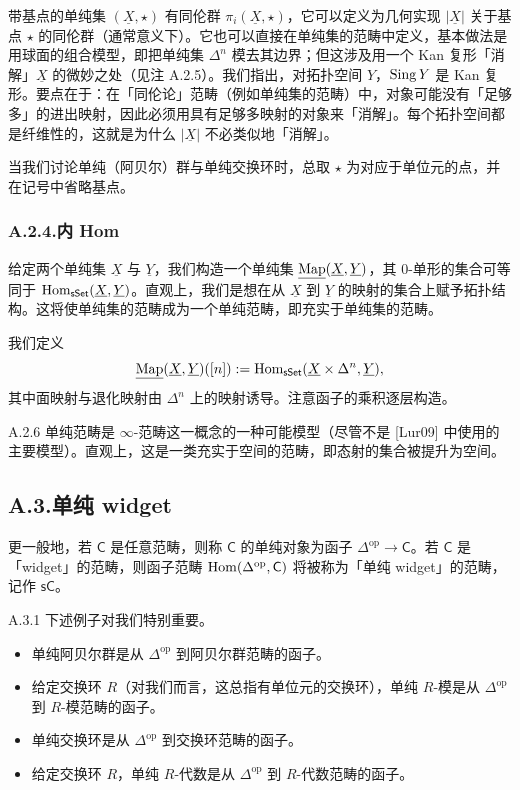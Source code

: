 带基点的单纯集 $(\underline X,\star)$ 有同伦群 $\pi_i(\underline X,\star)$，它可以定义为几何实现 $|\underline X|$ 关于基点 $\star$ 的同伦群（通常意义下）。它也可以直接在单纯集的范畴中定义，基本做法是用球面的组合模型，即把单纯集 $\Delta^n$ 模去其边界；但这涉及用一个 Kan 复形「消解」$\underline X$ 的微妙之处（见注 A.2.5）。我们指出，对拓扑空间 $Y$，$\operatorname{Sing} Y$ 是 Kan 复形。要点在于：在「同伦论」范畴（例如单纯集的范畴）中，对象可能没有「足够多」的进出映射，因此必须用具有足够多映射的对象来「消解」。每个拓扑空间都是纤维性的，这就是为什么 $|\underline X|$ 不必类似地「消解」。

当我们讨论单纯（阿贝尔）群与单纯交换环时，总取 $\star$ 为对应于单位元的点，并在记号中省略基点。

\subsubsection*{A.2.4.\quad 内 Hom}

给定两个单纯集 $\underline X$ 与 $\underline Y$，我们构造一个单纯集 $\underline{\operatorname{Map}}(\underline X,\underline Y)$，其 $0$-单形的集合可等同于 $\operatorname{Hom}_{\mathsf{sSet}}(\underline X,\underline Y)$。直观上，我们是想在从 $\underline X$ 到 $\underline Y$ 的映射的集合上赋予拓扑结构。这将使单纯集的范畴成为一个单纯范畴，即充实于单纯集的范畴。

我们定义
\[
\underline{\operatorname{Map}}(\underline X,\underline Y)([n]):=\operatorname{Hom}_{\mathsf{sSet}}(\underline X\times\Delta^n,\underline Y),
\]
其中面映射与退化映射由 $\Delta^n$ 上的映射诱导。注意函子的乘积逐层构造。

\begin{rem}{A.2.6}\label{thm:a6-06-17}
单纯范畴是 $\infty$-范畴这一概念的一种可能模型（尽管不是 [Lur09] 中使用的主要模型）。直观上，这是一类充实于空间的范畴，即态射的集合被提升为空间。
\end{rem}

\subsection*{A.3.\quad 单纯 widget}

更一般地，若 $\mathsf C$ 是任意范畴，则称 $\mathsf C$ 的单纯对象为函子 $\Delta^{\mathrm{op}}\to\mathsf C$。若 $\mathsf C$ 是「widget」的范畴，则函子范畴 $\operatorname{Hom}(\Delta^{\mathrm{op}},\mathsf C)$ 将被称为「单纯 widget」的范畴，记作 $\mathsf{sC}$。

\begin{exam}{A.3.1}\label{thm:a6-06-18}
下述例子对我们特别重要。
\begin{itemize}
\item 单纯阿贝尔群是从 $\Delta^{\mathrm{op}}$ 到阿贝尔群范畴的函子。
\item 给定交换环 $R$（对我们而言，这总指有单位元的交换环），单纯 $R$-模是从 $\Delta^{\mathrm{op}}$ 到 $R$-模范畴的函子。
\item 单纯交换环是从 $\Delta^{\mathrm{op}}$ 到交换环范畴的函子。
\item 给定交换环 $R$，单纯 $R$-代数是从 $\Delta^{\mathrm{op}}$ 到 $R$-代数范畴的函子。
\end{itemize}
\end{exam}

